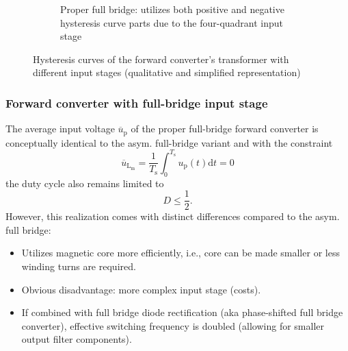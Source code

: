 \begin{frame}
\begin{figure}
\begin{subfigure}{0.45\textwidth}
			\caption{Proper full bridge: utilizes both positive and negative hysteresis curve parts due to the four-quadrant input stage}
		\end{subfigure}
		\caption{Hysteresis curves of the forward converter's transformer with different input stages (qualitative and simplified representation)}
	\end{figure}
\end{frame}

\begin{frame}
	\frametitle{Forward converter with full-bridge input stage}
	The average input voltage $\overline{u}_\mathrm{p}$ of the proper full-bridge forward converter is conceptually identical to the asym. full-bridge variant and with the constraint
	\begin{equation*}
		\overline{u}_\mathrm{L_\mathrm{m}} = \frac{1}{T_\mathrm{s}}\int_{0}^{T_\mathrm{s}}u_\mathrm{p}(t)\mathrm{d}t = 0
	\end{equation*}
	the duty cycle also remains limited to
	$$
		D\leq\frac{1}{2} .
	$$\pause
	However, this realization comes with distinct differences compared to the asym. full bridge:
	\begin{itemize}
		\item Utilizes magnetic core more efficiently, i.e., core can be made smaller or less winding turns are required. \pause
		\item Obvious disadvantage: more complex input stage (costs).
		\item If combined with full bridge diode rectification (aka phase-shifted full bridge converter), effective switching frequency is doubled (allowing for smaller output filter components).
	\end{itemize}
\end{frame}

